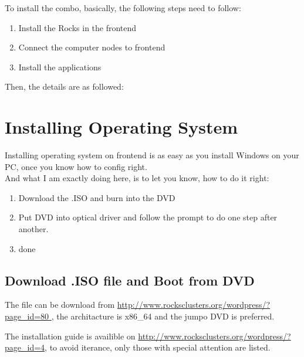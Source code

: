 To install the combo, basically, the following steps need to follow:

\begin{enumerate}
\item Install the Rocks in the frontend
\item Connect the computer nodes to frontend
\item Install the applications
\end{enumerate}

Then, the details are as followed:

\section{Installing Operating System}

Installing operating system on frontend is as easy as you install Windows on your PC, once you know how to config right. \\
And what I am exactly doing here, is to let you know, how to do it right:
\begin{enumerate}
\item Download the .ISO and burn into the DVD
\item Put DVD into optical driver and follow the prompt to do one step after another.
\item done
\end{enumerate}

\subsection{Download .ISO file and Boot from DVD}
The file can be download from \url{http://www.rocksclusters.org/wordpress/?page_id=80 }, the architacture is x86\_64 and the jumpo DVD is preferred. 

\begin{remark}
The installation guide is availible on \url{http://www.rocksclusters.org/wordpress/?page_id=4}, to avoid iterance, only those with special attention are listed.
\end{remark}

